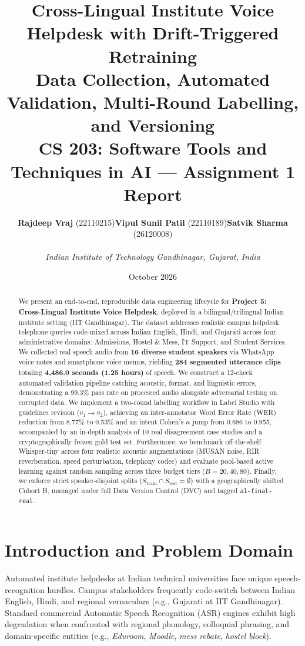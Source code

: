 \documentclass[10pt,a4paper,twocolumn]{article}
\title{\vspace{-0.5cm}\Large\textbf{\textcolor{primaryblue}{Cross-Lingual Institute Voice Helpdesk with Drift-Triggered Retraining}}\\[0.2cm]
\large\textbf{Data Collection, Automated Validation, Multi-Round Labelling, and Versioning}\\[0.15cm]
\normalsize\textcolor{secondaryblue}{CS 203: Software Tools and Techniques in AI --- Assignment 1 Report}}
\author{
\begin{tabular}[t]{ccc}
\textbf{Rajdeep Vraj} (22110215) & \textbf{Vipul Sunil Patil} (22110189) & \textbf{Satvik Sharma} (26120008)
\end{tabular}\\[0.15cm]
\textit{Indian Institute of Technology Gandhinagar, Gujarat, India}
}
\date{October 2026}
\renewcommand{\_}{\origunderscore\hspace{0pt}}
\begin{document}
\maketitle

\begin{abstract}
\noindent We present an end-to-end, reproducible data engineering lifecycle for \textbf{Project 5: Cross-Lingual Institute Voice Helpdesk}, deployed in a bilingual/trilingual Indian institute setting (IIT Gandhinagar). The dataset addresses realistic campus helpdesk telephone queries code-mixed across Indian English, Hindi, and Gujarati across four administrative domains: Admissions, Hostel \& Mess, IT Support, and Student Services. We collected real speech audio from \textbf{16 diverse student speakers} via WhatsApp voice notes and smartphone voice memos, yielding \textbf{284 segmented utterance clips} totaling \textbf{4,486.0 seconds (1.25 hours)} of speech. We construct a 12-check automated validation pipeline catching acoustic, format, and linguistic errors, demonstrating a 99.3\% pass rate on processed audio alongside adversarial testing on corrupted data. We implement a two-round labelling workflow in Label Studio with guidelines revision ($v_1 \to v_2$), achieving an inter-annotator Word Error Rate (WER) reduction from 8.77\% to 0.53\% and an intent Cohen's $\kappa$ jump from 0.686 to 0.955, accompanied by an in-depth analysis of 10 real disagreement case studies and a cryptographically frozen gold test set. Furthermore, we benchmark off-the-shelf Whisper-tiny across four realistic acoustic augmentations (MUSAN noise, RIR reverberation, speed perturbation, telephony codec) and evaluate pool-based active learning against random sampling across three budget tiers ($B=20, 40, 80$). Finally, we enforce strict speaker-disjoint splits ($S_{\text{train}} \cap S_{\text{test}} = \emptyset$) with a geographically shifted Cohort B, managed under full Data Version Control (DVC) and tagged \texttt{a1-final-real}.
\end{abstract}

\section{Introduction and Problem Domain}
Automated institute helpdesks at Indian technical universities face unique speech-recognition hurdles. Campus stakeholders frequently code-switch between Indian English, Hindi, and regional vernaculars (e.g., Gujarati at IIT Gandhinagar). Standard commercial Automatic Speech Recognition (ASR) engines exhibit high degradation when confronted with regional phonology, colloquial phrasing, and domain-specific entities (e.g., \textit{Eduroam}, \textit{Moodle}, \textit{mess rebate}, \textit{hostel block}).
\end{document}
